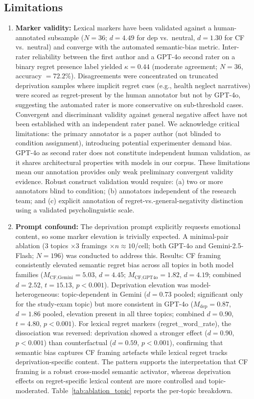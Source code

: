 \documentclass[conference,10pt]{IEEEtran}
\begin{document}
\subsection{Limitations}\label{sec:limitations}
\begin{enumerate}
  \item \textbf{Marker validity:} Lexical markers have been validated against a human-annotated subsample ($N=36$; $d=4.49$ for dep vs.\ neutral, $d=1.30$ for CF vs.\ neutral) and converge with the automated semantic-bias metric. Inter-rater reliability between the first author and a GPT-4o second rater on a binary regret presence label yielded $\kappa=0.44$ (moderate agreement; $N=36$, accuracy $=72.2\%$). Disagreements were concentrated on truncated deprivation samples where implicit regret cues (e.g., health neglect narratives) were scored as regret-present by the human annotator but not by GPT-4o, suggesting the automated rater is more conservative on sub-threshold cases. Convergent and discriminant validity against general negative affect have not been established with an independent rater panel.
We acknowledge critical limitations: the primary annotator is a paper author (not blinded to condition assignment), introducing potential experimenter demand bias. GPT-4o as second rater does not constitute independent human validation, as it shares architectural properties with models in our corpus. These limitations mean our annotation provides only weak preliminary convergent validity evidence. Robust construct validation would require: (a) two or more annotators blind to condition; (b) annotators independent of the research team; and (c) explicit annotation of regret-vs.-general-negativity distinction using a validated psycholinguistic scale.
  \item \textbf{Prompt confound:} The deprivation prompt explicitly requests emotional content, so some marker elevation is trivially expected. A minimal-pair ablation ($3$ topics $\times 3$ framings $\times n\!\approx\!10$/cell; both GPT-4o and Gemini-2.5-Flash; $N=196$) was conducted to address this. Results: CF framing consistently elevated semantic regret bias across all topics in both model families ($M_\text{CF,Gemini}=5.03$, $d=4.45$; $M_\text{CF,GPT4o}=1.82$, $d=4.19$; combined $d=2.52$, $t=15.13$, $p<0.001$). Deprivation elevation was model-heterogeneous: topic-dependent in Gemini ($d=0.73$ pooled; significant only for the study-exam topic) but more consistent in GPT-4o ($M_\text{dep}=0.87$, $d=1.86$ pooled, elevation present in all three topics; combined $d=0.90$, $t=4.80$, $p<0.001$). For lexical regret markers (regret\_word\_rate), the dissociation was reversed: deprivation showed a stronger effect ($d=0.90$, $p<0.001$) than counterfactual ($d=0.59$, $p<0.001$), confirming that semantic bias captures CF framing artefacts while lexical regret tracks deprivation-specific content. The pattern supports the interpretation that CF framing is a robust cross-model semantic activator, whereas deprivation effects on regret-specific lexical content are more controlled and topic-moderated. Table~\ref{tab:ablation_topic} reports the per-topic breakdown.


\end{enumerate}
\end{document}
